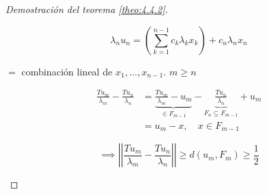 \begin{proof}[Demostración del teorema \ref{theo:4.4.2}]
\begin{enumerate}[label=\alph*)]
      \[\lambda_n u_n=\left(\sum_{k=1}^{n-1} c_k\lambda_k x_k\right)+c_n\lambda_n x_n\]

      $=$ combinación lineal de $x_1,\ldots,x_{n-1}$. $m\geq n$

      \begin{align*}
         \frac{T u_m}{\lambda_m}-\frac{T u_n}{\lambda_n}&=\underbrace{\frac{T u_m}{\lambda_m}-u_m}_{\in F_{m-1}}-\underbrace{\frac{T u_n}{\lambda_n}}_{F_n\subseteq F_{m-1}}+u_m\\
         &=u_m-x,\quad x\in F_{m-1}
      \end{align*}

      \[\implies \left|\left| \frac{T u_m}{\lambda_m}-\frac{T u_n}{\lambda_n}\right|\right|\geq d(u_m, F_{m})\geq \frac{1}{2}\]
   \end{enumerate}
\end{proof}
